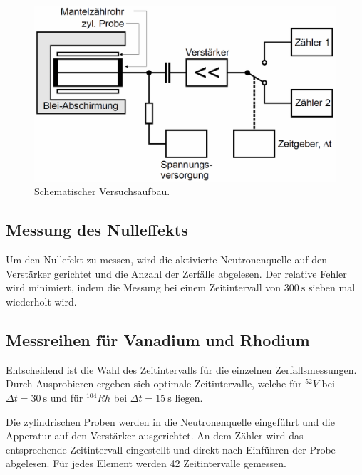 \begin{figure}
    \centering
    \includegraphics[width=.9\textwidth]{plots/Versuch.png}
    \caption{Schematischer Versuchsaufbau.\cite{Versuchsanleitung}}
    \label{fig:schVersuch}
\end{figure}

\subsection{Messung des Nulleffekts}
Um den Nullefekt zu messen, wird die aktivierte Neutronenquelle auf den Verstärker gerichtet und die Anzahl der Zerfälle abgelesen.
Der relative Fehler wird minimiert, indem die Messung bei einem Zeitintervall von $\SI{300}{\second}$ sieben mal wiederholt wird.

\subsection{Messreihen für Vanadium und Rhodium}
Entscheidend ist die Wahl des Zeitintervalls für die einzelnen Zerfallsmessungen. Durch Ausprobieren ergeben sich optimale Zeitintervalle, welche für $^{52}V$ bei $\Delta t = \SI{30}{\second}$
und für $^{104}Rh$ bei $\Delta t = \SI{15}{\second}$ liegen.

Die zylindrischen Proben werden in die Neutronenquelle eingeführt und die Apperatur auf den Verstärker ausgerichtet. An dem Zähler wird das entsprechende Zeitintervall eingestellt
und direkt nach Einführen der Probe abgelesen.
Für jedes Element werden 42 Zeitintervalle gemessen.